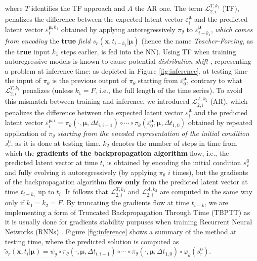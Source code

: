 where $T$ identifies the TF approach and $A$ the AR one. The term $\mathcal{L}_{2,i}^{T,k_1}$ (TF), penalizes the difference between the expected latent vector $\varepsilon_{i}^{\pmb{\mu}}$ and the predicted latent vector $\varepsilon_{i}^{\pmb{\mu},k_1}$ obtained by applying autoregressively $\pi_\theta$ to $\varepsilon_{i-k_1}^{\pmb{\mu}}$, \textit{which comes from encoding} the \textbf{true} \textit{field} $s_r(\mathbf{x},t_{i-k_1}|\pmb{\mu})$ (hence the name \textit{Teacher-Forcing}, as the \textbf{true} input $k_1$ steps earlier, is fed into the NN). Using TF when training autoregressive models is known to cause potential \textit{distribution shift} \cite{brandstetter2022message}, representing a problem at inference time: as depicted in Figure \ref{fig:inference}, at testing time the input of $\pi_\theta$ is the previous output of $\pi_\theta$ starting from $\varepsilon_0^{\pmb{\mu}}$, contrary to what $\mathcal{L}^{T,k_1}_{2,i}$ penalizes (unless $k_1= F$, i.e., the full length of the time series). To avoid this mismatch between training and inference, we introduced $\mathcal{L}^{A,k_2}_{2,i}$ (AR), which penalizes the difference between the expected latent vector $\varepsilon_{i}^{\pmb{\mu}}$ and the predicted latent vector $\varepsilon_i^{\pmb{\mu},i} = \pi_\theta(\cdot,\pmb{\mu},\Delta t_{i,i-1})\circ\cdots\circ\pi_\theta(\varepsilon_{0}^{\pmb{\mu}},\pmb{\mu},\Delta t_{1,0})$ obtained by repeated application of $\pi_\theta$ \textit{starting from the encoded representation of the initial condition} $s_r^0$, as it is done at testing time. $k_2$ denotes the number of steps in time from which the \textbf{gradients of the backpropagation algorithm} flow, i.e., the predicted latent vector at time $t_i$ is obtained by encoding the initial condition $s_r^0$ and fully evolving it autoregressively (by applying $\pi_\theta$ $i$ times), but the gradients of the backpropagation algorithm \textbf{flow only} from the predicted latent vector at time $t_{i-k_2}$ up to $t_i$. It follows that $\mathcal{L}^{T,k_1}_{2,i}$ and $\mathcal{L}^{A,k_2}_{2,i}$ are computed in the same way only if $k_1=k_2= F$. By truncating the gradients flow at time $t_{i-k}$, we are implementing a form of Truncated Backpropagation Through Time (TBPTT) as it is usually done for gradients stability purpuses when training Recurrent Neural Networks (RNNs) \cite{pmlr-v115-aicher20a}.
Figure \ref{fig:inference} shows a summary of the method at testing time, where the predicted solution is computed as
$\tilde{s}_r(\mathbf{x},t_i|\pmb{\mu}) =
     \psi_\theta\circ \pi_\theta(\cdot,\pmb{\mu},\Delta t_{i,i-1})\circ\cdots\circ\pi_\theta(\cdot,\pmb{\mu},\Delta t_{1,0})\circ\varphi_\theta(s^0_r)$.
